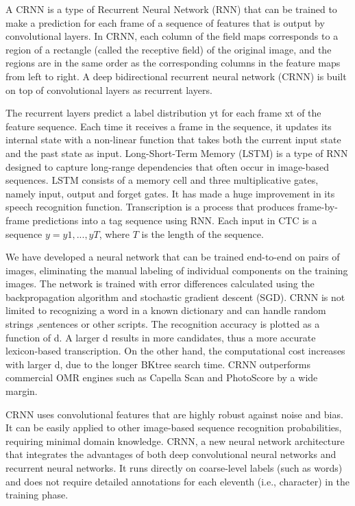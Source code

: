 A CRNN is a type of Recurrent Neural Network (RNN) that can be trained to make
a prediction for each frame of a sequence of features that is output by
convolutional layers. In CRNN, each column of the field maps corresponds to
a region of a rectangle (called the receptive field) of the original image, and
the regions are in the same order as the corresponding columns in the feature
maps from left to right. A deep bidirectional recurrent neural network (CRNN) is
built on top of convolutional layers as recurrent layers.

The recurrent layers predict a label distribution yt for each frame xt of the
feature sequence. Each time it receives a frame in the sequence, it updates its
internal state with a non-linear function that takes both the current input
state and the past state as input. Long-Short-Term Memory (LSTM) is a type of
RNN designed to capture long-range dependencies that often occur in image-based
sequences. LSTM consists of a memory cell and three multiplicative gates, namely
input, output and forget gates. It has made a huge improvement in its speech
recognition function.  Transcription is a process that produces frame-by-frame
predictions into a tag sequence using RNN. Each input in CTC is a sequence
$y = y1, ... , yT$, where $T$ is the length of the sequence.

We have developed a neural network that can be trained end-to-end on pairs of
images, eliminating the manual labeling of individual components on the training
images. The network is trained with error differences calculated using the
backpropagation algorithm and stochastic gradient descent (SGD).  CRNN is not
limited to recognizing a word in a known dictionary and can handle random
strings ,sentences or other scripts.  The recognition accuracy is plotted as
a function of d. A larger d results in more candidates, thus a more accurate
lexicon-based transcription. On the other hand, the computational cost increases
with larger d, due to the longer BKtree search time. CRNN outperforms commercial
OMR engines such as Capella Scan and PhotoScore by a wide margin.

CRNN uses convolutional features that are highly robust against noise and bias.
It can be easily applied to other image-based sequence recognition
probabilities, requiring minimal domain knowledge.  CRNN, a new neural network
architecture that integrates the advantages of both deep convolutional neural
networks and recurrent neural networks. It runs directly on coarse-level labels
(such as words) and does not require detailed annotations for each eleventh
(i.e., character) in the training phase.

